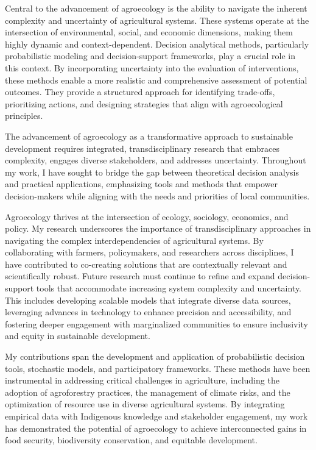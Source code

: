 \documentclass[
]{article}
\begin{document}
Central to the advancement of agroecology is the ability to navigate the
inherent complexity and uncertainty of agricultural systems. These
systems operate at the intersection of environmental, social, and
economic dimensions, making them highly dynamic and context-dependent.
Decision analytical methods, particularly probabilistic modeling and
decision-support frameworks, play a crucial role in this context. By
incorporating uncertainty into the evaluation of interventions, these
methods enable a more realistic and comprehensive assessment of
potential outcomes. They provide a structured approach for identifying
trade-offs, prioritizing actions, and designing strategies that align
with agroecological principles.

The advancement of agroecology as a transformative approach to
sustainable development requires integrated, transdisciplinary research
that embraces complexity, engages diverse stakeholders, and addresses
uncertainty. Throughout my work, I have sought to bridge the gap between
theoretical decision analysis and practical applications, emphasizing
tools and methods that empower decision-makers while aligning with the
needs and priorities of local communities.

Agroecology thrives at the intersection of ecology, sociology,
economics, and policy. My research underscores the importance of
transdisciplinary approaches in navigating the complex interdependencies
of agricultural systems. By collaborating with farmers, policymakers,
and researchers across disciplines, I have contributed to co-creating
solutions that are contextually relevant and scientifically robust.
Future research must continue to refine and expand decision-support
tools that accommodate increasing system complexity and uncertainty.
This includes developing scalable models that integrate diverse data
sources, leveraging advances in technology to enhance precision and
accessibility, and fostering deeper engagement with marginalized
communities to ensure inclusivity and equity in sustainable development.

My contributions span the development and application of probabilistic
decision tools, stochastic models, and participatory frameworks. These
methods have been instrumental in addressing critical challenges in
agriculture, including the adoption of agroforestry practices, the
management of climate risks, and the optimization of resource use in
diverse agricultural systems. By integrating empirical data with
Indigenous knowledge and stakeholder engagement, my work has
demonstrated the potential of agroecology to achieve interconnected
gains in food security, biodiversity conservation, and equitable
development.
\end{document}

